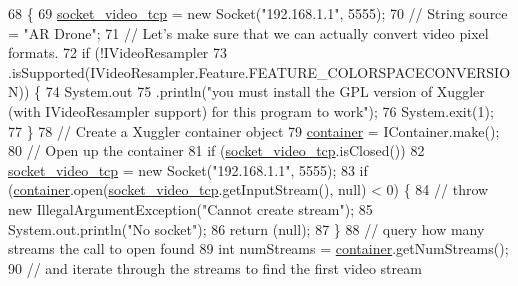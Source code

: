 \begin{DoxyCode}
68                                                                      \{
69         \hyperlink{classworkspace_1_1_a_r_drone_capture_image_1_1src_1_1_display_camera_image_a03bb3aa316596a78abdb6f7d6a7c14f8}{socket\_video\_tcp} = \textcolor{keyword}{new} Socket(\textcolor{stringliteral}{"192.168.1.1"}, 5555);
70         \textcolor{comment}{// String source = "AR Drone";}
71         \textcolor{comment}{// Let's make sure that we can actually convert video pixel formats.}
72         \textcolor{keywordflow}{if} (!IVideoResampler
73                 .isSupported(IVideoResampler.Feature.FEATURE\_COLORSPACECONVERSION)) \{
74             System.out
75                     .println(\textcolor{stringliteral}{"you must install the GPL version of Xuggler (with IVideoResampler support)
       for this program to work"});
76             System.exit(1);
77         \}
78         \textcolor{comment}{// Create a Xuggler container object}
79         \hyperlink{classworkspace_1_1_a_r_drone_capture_image_1_1src_1_1_display_camera_image_ad5078e38667c841c5c1d4541741fe5a9}{container} = IContainer.make();
80         \textcolor{comment}{// Open up the container}
81         \textcolor{keywordflow}{if} (\hyperlink{classworkspace_1_1_a_r_drone_capture_image_1_1src_1_1_display_camera_image_a03bb3aa316596a78abdb6f7d6a7c14f8}{socket\_video\_tcp}.isClosed())
82             \hyperlink{classworkspace_1_1_a_r_drone_capture_image_1_1src_1_1_display_camera_image_a03bb3aa316596a78abdb6f7d6a7c14f8}{socket\_video\_tcp} = \textcolor{keyword}{new} Socket(\textcolor{stringliteral}{"192.168.1.1"}, 5555);
83         \textcolor{keywordflow}{if} (\hyperlink{classworkspace_1_1_a_r_drone_capture_image_1_1src_1_1_display_camera_image_ad5078e38667c841c5c1d4541741fe5a9}{container}.open(\hyperlink{classworkspace_1_1_a_r_drone_capture_image_1_1src_1_1_display_camera_image_a03bb3aa316596a78abdb6f7d6a7c14f8}{socket\_video\_tcp}.getInputStream(), null) < 0) \{
84             \textcolor{comment}{// throw new IllegalArgumentException("Cannot create stream");}
85             System.out.println(\textcolor{stringliteral}{"No socket"});
86             \textcolor{keywordflow}{return} (null);
87         \}
88         \textcolor{comment}{// query how many streams the call to open found}
89         \textcolor{keywordtype}{int} numStreams = \hyperlink{classworkspace_1_1_a_r_drone_capture_image_1_1src_1_1_display_camera_image_ad5078e38667c841c5c1d4541741fe5a9}{container}.getNumStreams();
90         \textcolor{comment}{// and iterate through the streams to find the first video stream}

\end{DoxyCode}
